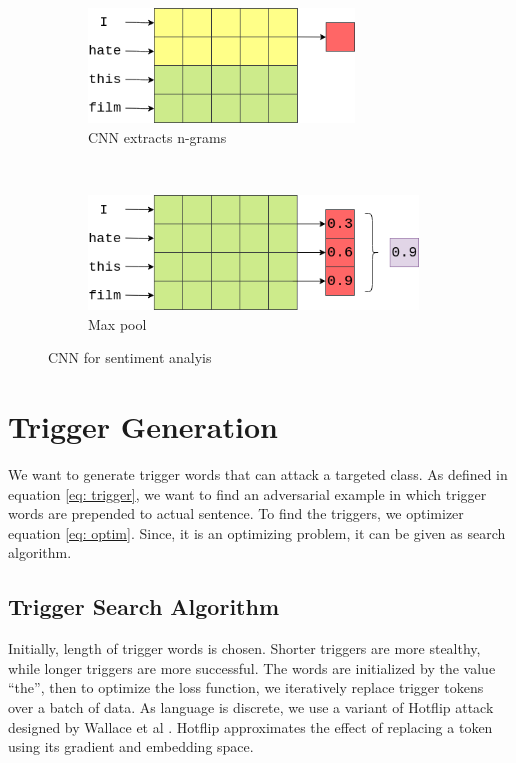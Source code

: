 \documentclass[12pt]{report}
\begin{document}
\begin{spacing}{1.5}
\begin{figure}[ht!]
    \centering
    \begin{subfigure}[t]{0.5\textwidth}
        \centering
        \includegraphics[height=1.2in]{./img/conv_work.png}
        \caption{CNN extracts n-grams}
    \end{subfigure}%
    ~ 
    \begin{subfigure}[t]{0.5\textwidth}
        \centering
        \includegraphics[height=1.2in]{./img/pool_work.png}
        \caption{Max pool}
    \end{subfigure}
    \caption{CNN for sentiment analyis}
 \end{figure}
  
\section{Trigger Generation}
We want to generate trigger words that can attack a targeted class. 
As defined in equation \ref{eq: trigger}, we want to find an adversarial example in which trigger words are prepended to actual sentence. To find the triggers, we optimizer equation \ref{eq: optim}. Since, it is an optimizing problem, it can be given as search algorithm.

\subsection*{Trigger Search Algorithm}
Initially, length of trigger words is chosen. Shorter triggers are more stealthy, while longer triggers are more successful. The words are initialized by the value ``the'', then to optimize the loss function, we iteratively replace trigger tokens over a batch of data. As language is discrete, we use a variant of Hotflip \cite{ebrahimi2018} attack designed by Wallace et al \cite{wallace2019}. Hotflip approximates the effect of replacing a token using its gradient and embedding space.


\end{spacing}
\end{document}
